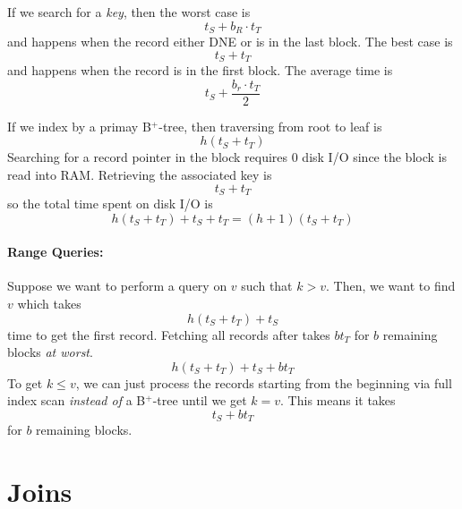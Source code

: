 \documentclass{report}
\newenvironment{example}{\begin{tcolorbox}[title={Example},colback=green!5!white,colframe=black!75!green]}{\end{tcolorbox}}
\renewcommand{\it}[1]{\textit{{#1}}}
\begin{document}
\begin{example}
    If we search for a \it{key}, then the worst case is
    \[t_S + b_R \cdot t_T\]
    and happens when the record either DNE or is in the last block. The best case is
    \[t_S + t_T\]
    and happens when the record is in the first block. The average time is
    \[t_S + \frac{b_r \cdot t_T}{2}\]
\end{example}

\noindent If we index by a primay B$^+$-tree, then traversing from root to leaf is
\[h(t_S + t_T)\]
Searching for a record pointer in the block requires 0 disk I/O since the
block is read into RAM. Retrieving the associated key is
\[t_S + t_T\]
so the total time spent on disk I/O is
\[h(t_S + t_T) + t_S + t_T = (h + 1)(t_S + t_T)\]

\paragraph{Range Queries:} Suppose we want to perform a query on $v$ such that
$k > v$. Then, we want to find $v$ which takes
\[h(t_S + t_T) + t_S\]
time to get the first record. Fetching all records after takes $bt_T$ for $b$
remaining blocks \it{at worst}.
\[h(t_S + t_T) + t_S + bt_T\]
To get $k \leq v$, we can just process the records starting from the beginning
via full index scan \it{instead of} a B$^+$-tree until we get $k = v$. This
means it takes
\[t_S + bt_T\]
for $b$ remaining blocks.

\section{Joins}
\end{document}
